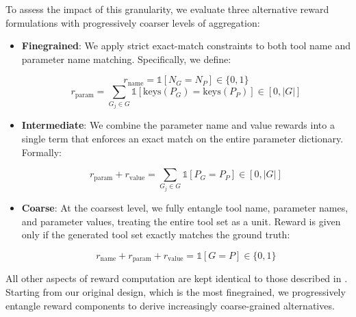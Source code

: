 To assess the impact of this granularity, we evaluate three alternative reward formulations with progressively coarser levels of aggregation:
\begin{itemize}[topsep=2pt, leftmargin=10pt, itemsep=2pt]

    \item \textbf{Finegrained}: We apply strict exact-match constraints to both tool name and parameter name matching. Specifically, we define:
    
    \begin{small}
    \begin{equation*}
        r_{\text{name}} = \mathds{1}[N_G = N_P] \in \{0, 1\}
    \end{equation*}
    \begin{equation*}
        r_{\text{param}} = \sum_{G_j \in G} \mathds{1}[\text{keys}(P_G) = \text{keys}(P_P)] \in [0, |G|]
    \end{equation*}
    \end{small}
    
    \item \textbf{Intermediate}: We combine the parameter name and value rewards into a single term that enforces an exact match on the entire parameter dictionary. Formally:
    
    \begin{small}
    \begin{equation*}
        r_{\text{param}} + r_{\text{value}} = \sum_{G_j \in G} \mathds{1}[P_G = P_P] \in [0, |G|]
    \end{equation*}
    \end{small}
    
    \item \textbf{Coarse}: At the coarsest level, we fully entangle tool name, parameter names, and parameter values, treating the entire tool set as a unit. Reward is given only if the generated tool set exactly matches the ground truth:
    
    \begin{small}
    \begin{equation*}
        r_{\text{name}} + r_{\text{param}} + r_{\text{value}} = \mathds{1}[G = P] \in \{0, 1\}
    \end{equation*}
    \end{small}

\end{itemize}
All other aspects of reward computation are kept identical to those described in . Starting from our original design, which is the most finegrained, we progressively entangle reward components to derive increasingly coarse-grained alternatives. 

